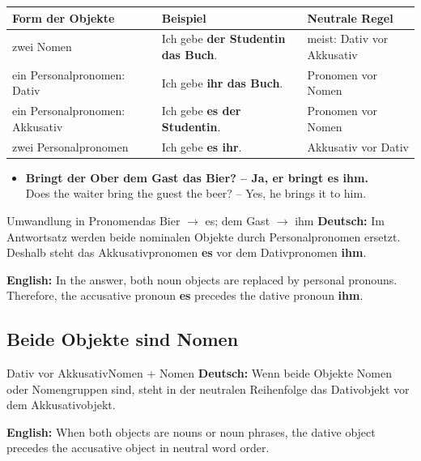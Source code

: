 \documentclass[a4paper,11pt]{article}
\newcommand{\GermanText}[1]{\textbf{Deutsch: }#1\par}
\newcommand{\EnglishText}[1]{{\small\color{SoftGray}\textbf{English: }#1\par}}
\newcommand{\ExampleItem}[2]{\item \textbf{#1}\\{\small\color{SoftGray}#2}}
\newcommand{\TableHeader}[1]{\color{white}\textbf{#1}}
\begin{document}
            \begin{longtable}{|p{4.0cm}|p{5.4cm}|p{5.0cm}|}
                \hline
                \rowcolor{HeaderBlueDark}
                \TableHeader{Form der Objekte} & \TableHeader{Beispiel} & \TableHeader{Neutrale Regel} \\
                \hline
                zwei Nomen & Ich gebe \textbf{der Studentin das Buch}. & meist: Dativ vor Akkusativ \\
                \hline
                ein Personalpronomen: Dativ & Ich gebe \textbf{ihr das Buch}. & Pronomen vor Nomen \\
                \hline
                ein Personalpronomen: Akkusativ & Ich gebe \textbf{es der Studentin}. & Pronomen vor Nomen \\
                \hline
                zwei Personalpronomen & Ich gebe \textbf{es ihr}. & Akkusativ vor Dativ \\
                \hline
            \end{longtable}
            
            \begin{exbox}
                \begin{itemize}
                    \ExampleItem{Bringt der Ober dem Gast das Bier? -- Ja, er bringt es ihm.}{Does the waiter bring the guest the beer? -- Yes, he brings it to him.}
                \end{itemize}
            \end{exbox}
            
            \begin{grammarentry}{Umwandlung in Pronomen}{das Bier $\rightarrow$ es; dem Gast $\rightarrow$ ihm}
                \GermanText{Im Antwortsatz werden beide nominalen Objekte durch Personalpronomen ersetzt. Deshalb steht das Akkusativpronomen \textbf{es} vor dem Dativpronomen \textbf{ihm}.}
                \EnglishText{In the answer, both noun objects are replaced by personal pronouns. Therefore, the accusative pronoun \textbf{es} precedes the dative pronoun \textbf{ihm}.}
            \end{grammarentry}
            
        \subsection{Beide Objekte sind Nomen}
            
            \begin{grammarentry}{Dativ vor Akkusativ}{Nomen + Nomen}
                \GermanText{Wenn beide Objekte Nomen oder Nomengruppen sind, steht in der neutralen Reihenfolge das Dativobjekt vor dem Akkusativobjekt.}
                \EnglishText{When both objects are nouns or noun phrases, the dative object precedes the accusative object in neutral word order.}
            \end{grammarentry}
            
\end{document}
